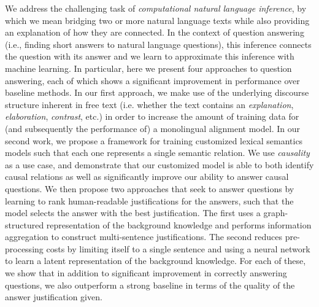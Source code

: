 We address the challenging task of \textit{computational natural language inference}, by which we mean bridging two or more natural language texts while also providing an explanation of how they are connected.  In the context of question answering (i.e., finding short answers to natural language questions), this inference connects the question with its answer and we learn to approximate this inference with machine learning.  
In particular, here we present four approaches to question answering, each of which shows a significant improvement in performance over baseline methods.  
In our first approach, we make use of the underlying discourse structure inherent in free text (i.e. whether the text contains an \textit{explanation}, \textit{elaboration}, \textit{contrast}, etc.) in order to increase the amount of training data for (and subsequently the performance of) a monolingual alignment model.  
In our second work, we propose a framework for training customized lexical semantics models such that each one represents a single semantic relation.  We use \textit{causality} as a use case, and demonstrate that our customized model is able to both identify causal relations as well as significantly improve our ability to answer causal questions.  
We then propose two approaches that seek to answer questions by learning to rank human-readable justifications for the answers, such that the model selects the answer with the best justification.  The first uses a graph-structured representation of the background knowledge and performs information aggregation to construct multi-sentence justifications.  The second reduces pre-processing costs by limiting itself to a single sentence and using a neural network to learn a latent representation of the background knowledge.  For each of these, we show that in addition to significant improvement in correctly answering questions, we also outperform a strong baseline in terms of the quality of the answer justification given.
  